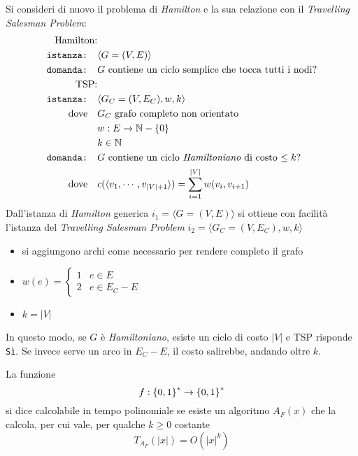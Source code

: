 Si consideri di nuovo il problema di \emph{Hamilton} e la sua relazione con il \emph{Travelling Salesman Problem}:
\begin{align*}
    \text{Hamilton:} & \quad \\
    \texttt{istanza:} \quad & \langle G=(V,E) \rangle \\
    \texttt{domanda:} \quad & G \text{ contiene un ciclo semplice che tocca tutti i nodi?} \\
    \text{TSP:} & \quad \\
    \texttt{istanza:} \quad & \langle G_C=(V,E_C), w, k \rangle \\
    \text{dove} \quad & G_C \text{ grafo completo non orientato} \\
    & w : E \to \mathbb{N} - \left\{ 0 \right\} \\
    & k \in \mathbb{N} \\
    \texttt{domanda:} \quad & G \text{ contiene un ciclo \emph{Hamiltoniano} di costo $\leq k$?} \\
    \text{dove} \quad &  c(\langle v_1, \cdots, v_{|V|+1} \rangle) = \sum_{i=1}^{|V|} w(v_i, v_{i+1} )  \\
\end{align*}
Dall'istanza di \emph{Hamilton} generica 
$i_1 = \langle G=(V,E) \rangle$
si ottiene con facilità l'istanza del \emph{Travelling Salesman Problem}
$i_2 = \langle G_C=(V,E_C), w, k \rangle$
\begin{itemize}[parsep=0pt,partopsep=0pt,topsep=2pt]
    \item si aggiungono archi come necessario per rendere completo il grafo
    \item $w(e) = 
        \begin{cases}
            1 & e \in E \\
            2 & e \in E_C - E
        \end{cases}
        $
    \item $k = |V|$
\end{itemize}
In questo modo, se $G$ è \emph{Hamiltoniano}, esiste un ciclo di costo $|V|$ e TSP risponde \texttt{Sì}. Se invece serve un arco in $E_C - E$, il costo salirebbe, andando oltre $k$.

\begin{definition}
    \label{def:funzionectp}
    La funzione
    \begin{equation*}
        f : \left\{0,1\right\}^{*} \to \left\{0,1\right\}^{*} 
    \end{equation*}
    si dice calcolabile in tempo polinomiale se esiste un algoritmo $A_F (x)$ che la calcola, per cui vale, per qualche $k \geq 0$ costante
    \begin{equation*}
        T_{A_{F}} (|x|) = O \left( |x|^{k} \right)
    \end{equation*}
\end{definition}

